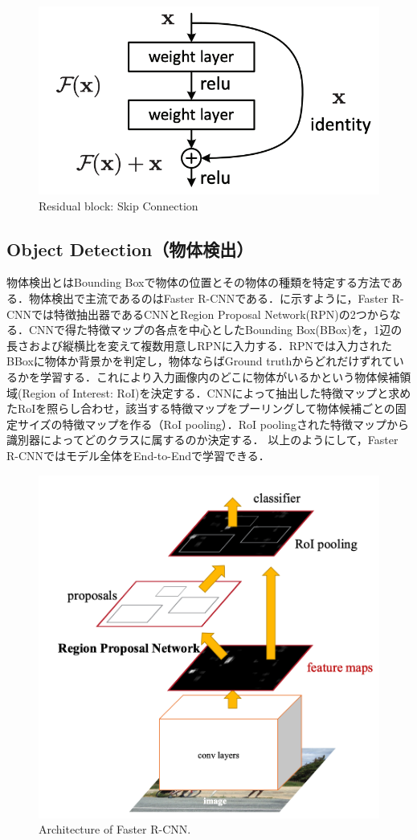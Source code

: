 \begin{figure}
    \centering
    \includegraphics[width=0.5\linewidth]{figure/chapter2/skipconnection}
    \caption{Residual block: Skip Connection}
    \label{fig:skipconnection}
\end{figure}



\subsection{Object Detection（物体検出）}
物体検出とはBounding Boxで物体の位置とその物体の種類を特定する方法である．物体検出で主流であるのはFaster R-CNNである\cite{fasterRCNN}．に示すように，Faster R-CNNでは特徴抽出器であるCNNとRegion Proposal Network(RPN)の2つからなる．CNNで得た特徴マップの各点を中心としたBounding Box(BBox)を，1辺の長さおよび縦横比を変えて複数用意しRPNに入力する．RPNでは入力されたBBoxに物体か背景かを判定し，物体ならばGround truthからどれだけずれているかを学習する．これにより入力画像内のどこに物体がいるかという物体候補領域(Region of Interest: RoI)を決定する．CNNによって抽出した特徴マップと求めたRoIを照らし合わせ，該当する特徴マップをプーリングして物体候補ごとの固定サイズの特徴マップを作る（RoI pooling）．RoI poolingされた特徴マップから識別器によってどのクラスに属するのか決定する．
以上のようにして，Faster R-CNNではモデル全体をEnd-to-Endで学習できる．

\begin{figure}
    \centering
    \includegraphics[width=0.7\linewidth]{figure/chapter2/fasterr-cnn}
    \caption[Architecture of Faster R-CNN.]{Architecture of Faster R-CNN\cite{fasterRCNN}.}
    \label{fig:fasterRCNN}
\end{figure}


